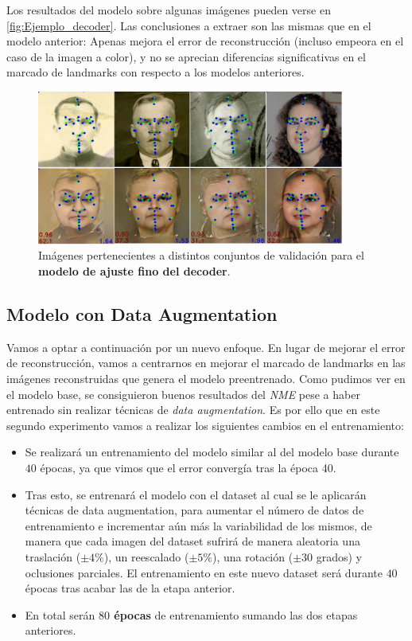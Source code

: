         Los resultados del modelo sobre algunas imágenes pueden verse en \autoref{fig:Ejemplo_decoder}. Las conclusiones a extraer son las mismas que en el modelo anterior: Apenas mejora el error de reconstrucción (incluso empeora en el caso de la imagen a color), y no se aprecian diferencias significativas en el marcado de landmarks con respecto a los modelos anteriores.

        \begin{figure}[H]
            \centering
            \includegraphics[width=0.9\textwidth]{img/image_decoder.png}
            \caption{Imágenes pertenecientes a distintos conjuntos de validación para el \textbf{modelo de ajuste fino del decoder}.}
            \label{fig:Ejemplo_decoder}
        \end{figure}

    \subsection{Modelo con Data Augmentation}
        \noindent Vamos a optar a continuación por un nuevo enfoque. En lugar de mejorar el error de reconstrucción, vamos a centrarnos en mejorar el marcado de landmarks en las imágenes reconstruidas que genera el modelo preentrenado. Como pudimos ver en el modelo base, se consiguieron buenos resultados del \textit{NME} pese a haber entrenado sin realizar técnicas de \textit{data augmentation}. Es por ello que en este segundo experimento vamos a realizar los siguientes cambios en el entrenamiento: 
        
        \begin{itemize}
            \item Se realizará un entrenamiento del modelo similar al del modelo base durante $40$ épocas, ya que vimos que el error convergía tras la época 40.
            \item Tras esto, se entrenará el modelo con el dataset al cual se le aplicarán técnicas de data augmentation, para aumentar el número de datos de entrenamiento e incrementar aún más la variabilidad de los mismos, de manera que cada imagen del dataset sufrirá de manera aleatoria una traslación ($\pm 4\%$), un reescalado ($\pm 5\%$), una rotación ($\pm 30$ grados) y oclusiones parciales. El entrenamiento en este nuevo dataset será durante $40$ épocas tras acabar las de la etapa anterior.
            \item En total serán \textbf{$80$ épocas} de entrenamiento sumando las dos etapas anteriores.
        \end{itemize}

